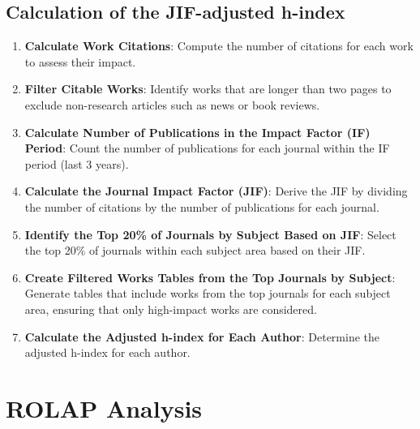 \subsection{Calculation of the JIF-adjusted h-index}
\begin{enumerate}
      \item \textbf{Calculate Work Citations}: Compute the number of citations for each work to assess their impact.

      \item \textbf{Filter Citable Works}: Identify works that are longer than two pages to exclude non-research articles such as news or book reviews.

      \item \textbf{Calculate Number of Publications in the Impact Factor (IF) Period}: Count the number of publications
            for each journal within the IF period (last 3 years).

      \item \textbf{Calculate the Journal Impact Factor (JIF)}: Derive the JIF by dividing the number of citations by
            the number of publications for each journal.

      \item \textbf{Identify the Top 20\% of Journals by Subject Based on JIF}: Select the top 20\% of journals within
            each subject area based on their JIF\@.

      \item \textbf{Create Filtered Works Tables from the Top Journals by Subject}: Generate tables that include works from
            the top journals for each subject area, ensuring that only high-impact works are considered.


      \item \textbf{Calculate the Adjusted h-index for Each Author}: Determine the adjusted h-index for each author.
\end{enumerate}

\section{ROLAP Analysis}

